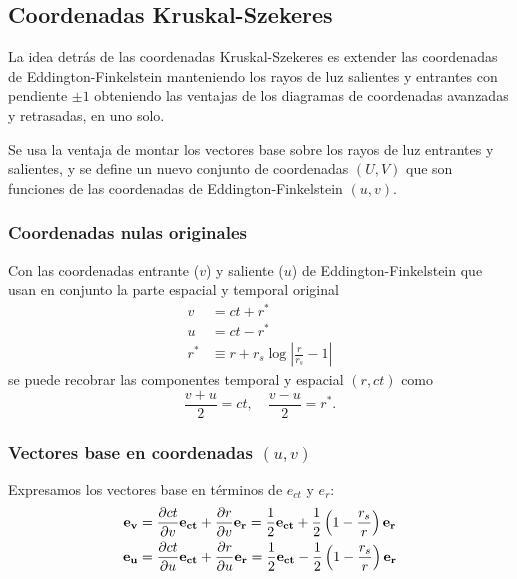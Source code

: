 \subsection{Coordenadas Kruskal-Szekeres}
La idea detrás de las coordenadas Kruskal-Szekeres es extender las coordenadas de Eddington-Finkelstein manteniendo los rayos de luz salientes y entrantes con pendiente $\pm 1$ obteniendo las ventajas de los diagramas de coordenadas avanzadas y retrasadas, en uno solo.

Se usa la ventaja de montar los vectores base sobre los rayos de luz entrantes y salientes, y se define un nuevo conjunto de coordenadas \( (U, V) \) que son funciones de las coordenadas de Eddington-Finkelstein \( (u, v) \).
\subsubsection{Coordenadas nulas originales}
Con las coordenadas entrante (\(v\)) y saliente (\(u\)) de Eddington-Finkelstein que usan en conjunto la parte espacial y temporal original
\begin{equation}
    \begin{aligned}
        v   & = ct + r^*                                      \\
        u   & = ct - r^*                                      \\
        r^* & \equiv r + r_s \log\left|\frac{r}{r_s}-1\right|
    \end{aligned}
\end{equation}
se puede recobrar las componentes temporal y espacial \( (r, ct) \) como 
\begin{equation}
\frac{v+ u}{2} = ct, \quad \frac{v- u}{2} = r^*.
\label{eq:ryt_in_terms_of_uv}
\end{equation}


\subsubsection{Vectores base en coordenadas \( (u, v) \)}
Expresamos los vectores base en términos de \( e_{ct} \) y \( e_r \):
\begin{equation}
    \begin{aligned}
        \mathbf{e_v} & = \frac{\partial ct}{\partial v}\mathbf{e_{ct}} + \frac{\partial r}{\partial v}\mathbf{e_r} = \frac{1}{2}\mathbf{e_{ct}} + \frac{1}{2}\left(1-\frac{r_s}{r}\right)\mathbf{e_r} \\
        \mathbf{e_u} & = \frac{\partial ct}{\partial u}\mathbf{e_{ct}} + \frac{\partial r}{\partial u}\mathbf{e_r} = \frac{1}{2}\mathbf{e_{ct}} - \frac{1}{2}\left(1-\frac{r_s}{r}\right)\mathbf{e_r}
    \end{aligned}
\end{equation}



